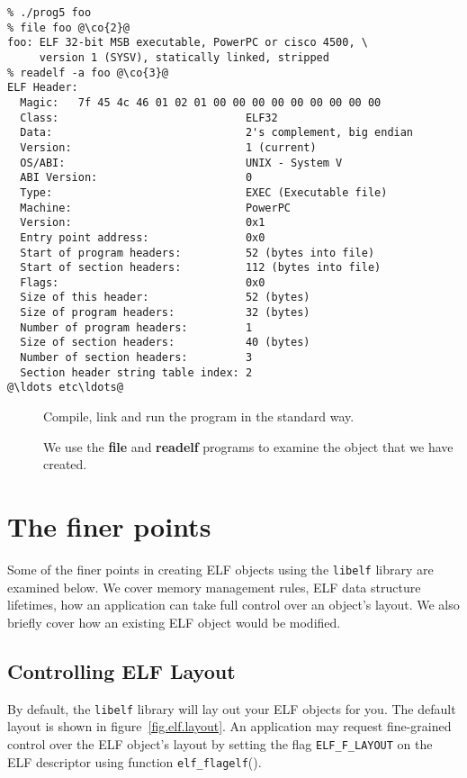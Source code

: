 \documentclass[a4paper]{book}
\makeatletter
\newcommand{\constant}[1]{\texttt{#1}}
\newcommand{\function}[1]{\texttt{#1}()}
\newcommand{\library}[1]{\texttt{#1}}
\newcommand{\tool}[1]{\textbf{#1}}
\newenvironment{callout}[2][blue]{%
  \begingroup\newcommand{\@cocolor}{#1}%
  \newcommand{\@cogroup}[1]{#2}}{\endgroup}
\newcommand{\@co}[1]{\framebox{\textbf{\color{\@cocolor}#1}}}
\newcommand{\co}[1]{%
  \hypertarget{\@cogroup.#1.co}{%
    \hyperlink{\@cogroup.#1.cr}{\@co{#1}}}}
\newcommand{\coref}[1]{%
  \hypertarget{\@cogroup.#1.cr}{%
    \hyperlink{\@cogroup.#1.co}{\@co{#1}}}}
\makeatother
\begin{document}
\begin{callout}[red]{scr5}
  \begin{lstlisting}[language={}, basicstyle=\small\ttfamily,
      label=scr.prog5, caption=Compiling and Running prog5]
% cc -o prog5 prog5.c -lelf @\co{1}@
% ./prog5 foo
% file foo @\co{2}@
foo: ELF 32-bit MSB executable, PowerPC or cisco 4500, \
     version 1 (SYSV), statically linked, stripped
% readelf -a foo @\co{3}@
ELF Header:
  Magic:   7f 45 4c 46 01 02 01 00 00 00 00 00 00 00 00 00
  Class:                             ELF32
  Data:                              2's complement, big endian
  Version:                           1 (current)
  OS/ABI:                            UNIX - System V
  ABI Version:                       0
  Type:                              EXEC (Executable file)
  Machine:                           PowerPC
  Version:                           0x1
  Entry point address:               0x0
  Start of program headers:          52 (bytes into file)
  Start of section headers:          112 (bytes into file)
  Flags:                             0x0
  Size of this header:               52 (bytes)
  Size of program headers:           32 (bytes)
  Number of program headers:         1
  Size of section headers:           40 (bytes)
  Number of section headers:         3
  Section header string table index: 2
@\ldots etc\ldots@
  \end{lstlisting}

  \begin{description}
  \item[\coref{1}] Compile, link and run the program in the standard
    way.
  \item[\coref{2} \coref{3}] We use the \tool{file} and \tool{readelf}
    programs to examine the object that we have created.
  \end{description}
\end{callout}

\section{The finer points}
Some of the finer points in creating ELF objects using the
\library{libelf} library are examined below.  We cover memory
management rules, ELF data structure lifetimes, how an application can
take full control over an object's layout.  We also briefly cover how
an existing ELF object would be modified.

\subsection{Controlling ELF Layout}
By default, the \library{libelf} library will lay out your ELF objects
for you.  The default layout is shown in figure~\vref{fig.elf.layout}.
An application may request fine-grained control over the ELF object's
layout by setting the flag \constant{ELF\_F\_LAYOUT} on the ELF
descriptor using function \function{elf\_flagelf}.
\end{document}

